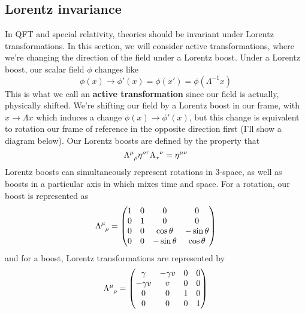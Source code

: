 \subsection{Lorentz invariance} 
In QFT and special relativity, theories should be invariant under Lorentz transformations. In this section, we will consider active transformations, where we're changing the direction of the field under a Lorentz boost. Under a Lorentz boost, our scalar field $\phi$ changes like 
\[
\phi(x) \rightarrow \phi'(x)  = \phi (x')  = \phi(\Lambda^{ - 1} x ) 
\] 
This is what we call an \textbf{active transformation} since our field is actually, physically shifted.
We're shifting our field by a Lorentz boost in our frame, with $x \rightarrow \Lambda x  $ which induces a change $\phi(x) \rightarrow \phi' (x)$, but this change is equivalent to rotation our frame of reference in the opposite direction first (I'll show a diagram below). 
Our Lorentz boosts are defined by the property that 
\[
\Lambda\indices{^\mu_\rho} \eta^{\rho \tau} \Lambda \indices{_\tau^\nu} = \eta^{ \mu \nu } 
\] 
Lorentz boosts can simultaneously represent rotations in 3-space, as well as boosts in a particular axis in which mixes time and space. For a rotation, our boost is represented as 
\[ 
\Lambda\indices{^\mu_\rho} = \begin{pmatrix} 
1 & 0 & 0 & 0 \\
0 & 1 & 0 & 0 \\
0 & 0 & \cos \theta &  - \sin \theta \\
0 & 0 & - \sin \theta & \cos \theta 
\end{pmatrix} 
\]  
and for a boost, Lorentz transformations are represented by 
\[ 
\Lambda\indices{^\mu_\rho}  = \begin{pmatrix} 
\gamma &  - \gamma v & 0 & 0 \\
- \gamma v & v & 0 & 0 \\
0 & 0 & 1 & 0 \\
0 & 0 & 0 & 1 
\end{pmatrix} 
\] 

